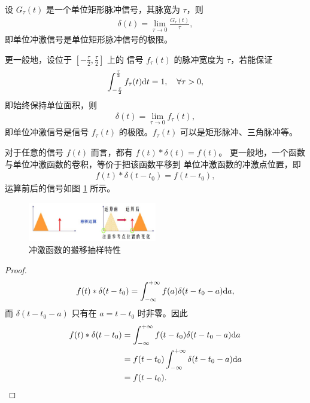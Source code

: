 \begin{definition}[单位冲激信号的极限定义式]
    设 $G_{\tau}(t)$ 是一个单位矩形脉冲信号，其脉宽为 $\tau$，则
    \begin{align*}
        \delta(t) = \lim_{\tau \to 0}\frac{G_{\tau}(t)}{\tau},
    \end{align*}
    即单位冲激信号是单位矩形脉冲信号的极限。
\end{definition}

\begin{remark}
    更一般地，设位于 $[-\frac{\tau}{2}, \frac{\tau}{2}]$ 上的
    信号 $f_{\tau}(t)$ 的脉冲宽度为 $\tau$，若能保证
    \begin{align*}
        \int_{-\frac{\tau}{2}}^{\frac{\tau}{2}}f_{\tau}(t)\mathrm{d}t = 1, \quad \forall \tau > 0,
    \end{align*}
    即始终保持单位面积，则
    \begin{align*}
        \delta(t) = \lim_{\tau \to 0}f_{\tau}(t),
    \end{align*}
    即单位冲激信号是信号 $f_{\tau}(t)$ 的极限。$f_{\tau}(t)$ 可以是矩形脉冲、三角脉冲等。
\end{remark}

\begin{property}[冲激函数的搬移抽样特性]
    对于任意的信号 $f(t)$ 而言，都有 $f(t) * \delta(t) = f(t)$。
    更一般地，一个函数与单位冲激函数的卷积，等价于把该函数平移到
    单位冲激函数的冲激点位置，即
    \begin{align*}
        f(t) * \delta(t - t_0) = f(t - t_0),
    \end{align*}
    运算前后的信号如图 \ref{fig:impulse-signal-convolution-translation} 所示。
    \begin{figure}[H]
        \centering
        \includegraphics[width=0.5\textwidth]{chap1/img/impulse-signal-convolution-translation.png}
        \caption{冲激函数的搬移抽样特性}
        \label{fig:impulse-signal-convolution-translation}
    \end{figure}
\end{property}

\begin{proof}
    \begin{align*}
        f(t) * \delta(t - t_0) = \int_{-\infty}^{+\infty}f(a)\delta(t - t_0 - a)\mathrm{d}a,
    \end{align*}
    而 $\delta(t - t_0 - a)$ 只有在 $a = t - t_0$ 时非零。因此
    \begin{align*}
        f(t) * \delta(t - t_0) & = \int_{-\infty}^{+\infty}f(t - t_0)\delta(t - t_0 - a)\mathrm{d}a \\
        & = f(t - t_0)\int_{-\infty}^{+\infty}\delta(t - t_0 - a)\mathrm{d}a \\
        & = f(t - t_0).
    \end{align*}
\end{proof}

